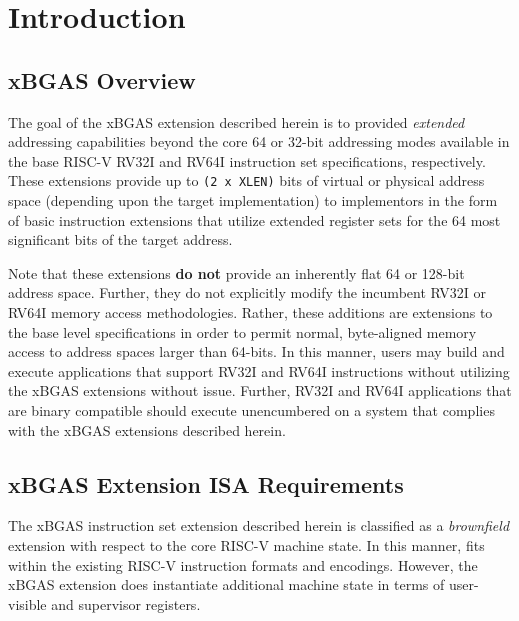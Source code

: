 \documentclass{article}
\begin{document}
\clearpage
\section{Introduction}

\subsection{xBGAS Overview}

The goal of the \gls{xBGAS} extension described herein is to provided \textit{extended} 
addressing capabilities beyond the core 64 or 32-bit addressing modes available in the 
base RISC-V RV32I and RV64I instruction set specifications, respectively.  These extensions provide up 
to \texttt{(2 x XLEN)} bits of virtual or physical address space (depending upon the target implementation) 
to implementors in the form of basic instruction extensions that utilize extended 
register sets for the 64 most significant bits of the target address.  

Note that these extensions \textbf{do not} provide an inherently flat 64 or 128-bit address space.  
Further, they do not explicitly modify the incumbent RV32I or RV64I memory access 
methodologies.  Rather, these additions are extensions to the base level specifications in order to 
permit normal, byte-aligned memory access to address spaces larger than 64-bits.  In 
this manner, users may build and execute applications that support RV32I and RV64I 
instructions without utilizing the xBGAS extensions without issue.  Further, RV32I and RV64I 
applications that are binary compatible should execute unencumbered on a system that 
complies with the xBGAS extensions described herein.

\subsection{xBGAS Extension ISA Requirements}

The xBGAS instruction set extension described herein is classified 
as a \textit{brownfield} extension with respect to the core RISC-V 
machine state.  In this manner, fits within the existing RISC-V instruction 
formats and encodings.  However, the xBGAS extension does instantiate 
additional machine state in terms of user-visible and supervisor registers.
\end{document}
